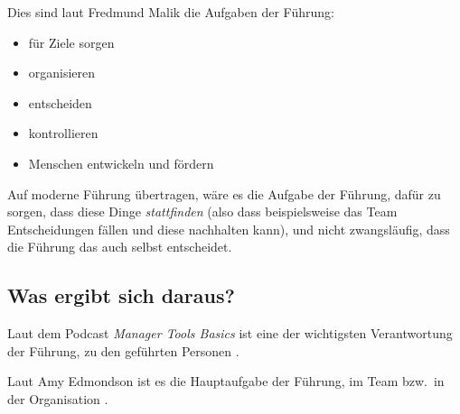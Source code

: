Dies sind laut Fredmund Malik \cite{malik-fuehrung} die Aufgaben der Führung:

\begin{itemize}
    \item für Ziele sorgen
    \item organisieren
    \item entscheiden
    \item kontrollieren
    \item Menschen entwickeln und fördern
\end{itemize}

Auf moderne Führung übertragen, wäre es die Aufgabe der Führung, dafür zu sorgen, dass diese Dinge \emph{stattfinden} (also dass beispielsweise das Team Entscheidungen fällen und diese nachhalten kann), und nicht zwangsläufig, dass die Führung das auch selbst entscheidet.

\subsection{Was ergibt sich daraus?}

Laut dem Podcast \emph{Manager Tools Basics} \cite{manager-tools-basics} ist eine der wichtigsten Verantwortung der Führung,  zu den geführten Personen .

Laut Amy Edmondson \cite{the-fearless-organisation}\cite{die-angstfreie-organisation} ist es die Hauptaufgabe der Führung, im Team bzw.~in der Organisation .
